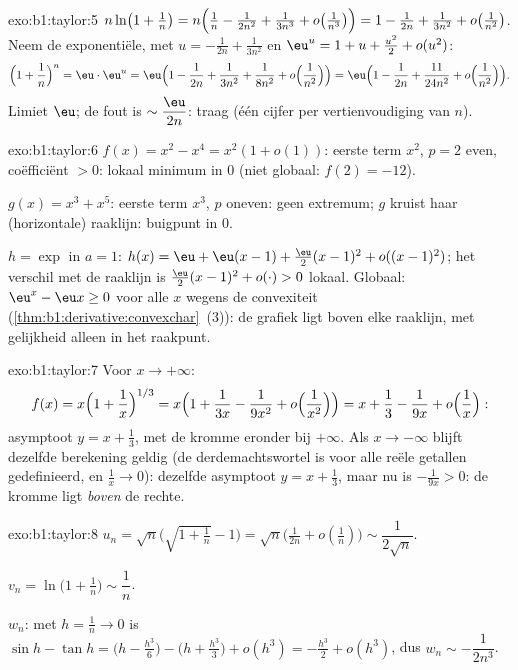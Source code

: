 \begin{solution}{exo:b1:taylor:5}
$n\ln\bigl(1 + \frac1n\bigr) = n\Bigl(\frac1n - \frac{1}{2n^2} +
\frac{1}{3n^3} + o\bigl(\frac{1}{n^3}\bigr)\Bigr) = 1 - \frac{1}{2n}
+ \frac{1}{3n^2} + o\bigl(\frac{1}{n^2}\bigr)$. Neem de
exponentiële, met $u = -\frac{1}{2n} + \frac{1}{3n^2}$ en $\eu^u = 1
+ u + \frac{u^2}2 + o(u^2)$:
\[
\Bigl(1 + \frac1n\Bigr)^n = \eu\cdot \eu^{u}
= \eu\Bigl(1 - \frac{1}{2n} + \frac{1}{3n^2} + \frac{1}{8n^2}
+ o\Bigl(\frac{1}{n^2}\Bigr)\Bigr)
= \eu\Bigl(1 - \frac{1}{2n} + \frac{11}{24n^2} +
o\Bigl(\frac{1}{n^2}\Bigr)\Bigr).
\]
Limiet $\eu$; de fout is $\sim \dfrac{\eu}{2n}$: traag (één cijfer
per vertienvoudiging van $n$).
\end{solution}

\begin{solution}{exo:b1:taylor:6}
$f(x) = x^2 - x^4 = x^2(1 + o(1))$: eerste term $x^2$, $p = 2$ even,
coëfficiënt $> 0$: lokaal minimum in $0$ (niet globaal: $f(2) =
-12$).

$g(x) = x^3 + x^5$: eerste term $x^3$, $p$ oneven: geen extremum;
$g$ kruist haar (horizontale) raaklijn: buigpunt in $0$.

$h = \exp$ in $a = 1$: $h(x) = \eu + \eu(x-1) + \frac{\eu}{2}(x-1)^2
+ o((x-1)^2)$; het verschil met de raaklijn is
$\frac{\eu}{2}(x-1)^2 + o(\cdot) > 0$ lokaal. Globaal: $\eu^x - \eu
x \geq 0$ voor alle $x$ wegens de convexiteit
(\cref{thm:b1:derivative:convexchar}~(3)): de grafiek ligt boven
elke raaklijn, met gelijkheid alleen in het raakpunt.
\end{solution}

\begin{solution}{exo:b1:taylor:7}
Voor $x \to +\infty$:
\[
f(x) = x\Bigl(1 + \frac1x\Bigr)^{1/3}
= x\Bigl(1 + \frac{1}{3x} - \frac{1}{9x^2} +
o\Bigl(\frac{1}{x^2}\Bigr)\Bigr)
= x + \frac13 - \frac{1}{9x} + o\Bigl(\frac1x\Bigr):
\]
asymptoot $y = x + \frac13$, met de kromme eronder bij $+\infty$.
Als $x \to -\infty$ blijft dezelfde berekening geldig (de
derdemachtswortel is voor alle reële getallen gedefinieerd, en
$\frac1x \to 0$): dezelfde asymptoot $y = x + \frac13$, maar nu is
$-\frac{1}{9x} > 0$: de kromme ligt \emph{boven} de rechte.
\end{solution}

\begin{solution}{exo:b1:taylor:8}
$u_n = \sqrt n\bigl(\sqrt{1 + \tfrac1n} - 1\bigr) = \sqrt
n\bigl(\frac{1}{2n} + o(\frac1n)\bigr) \sim \dfrac{1}{2\sqrt n}$.

$v_n = \ln\bigl(1 + \frac1n\bigr) \sim \dfrac 1n$.

$w_n$: met $h = \frac1n \to 0$ is $\sin h - \tan h = \bigl(h -
\frac{h^3}{6}\bigr) - \bigl(h + \frac{h^3}{3}\bigr) + o(h^3) =
-\frac{h^3}{2} + o(h^3)$, dus $w_n \sim -\dfrac{1}{2n^3}$.
\end{solution}

